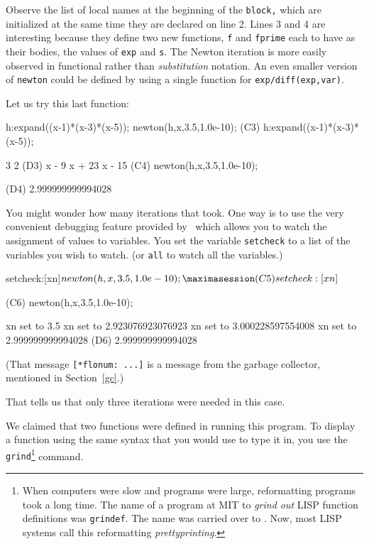 \endmaximasession

Observe the list of local names at the beginning of the 
{\tt block,}
which are initialized at the same time they are declared on line 2.
Lines 3 and 4 are interesting because they define two new functions,
{\tt f}
and 
{\tt fprime}
each to have as their bodies, the values of
{\tt exp}
and {\tt s}.
The Newton iteration is more easily observed in functional
rather than {\it substitution} notation.
An even smaller version of {\tt newton}
could be defined by
using a single function for {\tt exp/diff(exp,var)}.

Let us try this last function:

\beginmaximasession
h:expand((x-1)*(x-3)*(x-5));
newton(h,x,3.5,1.0e-10);
\maximasession
(C3) h:expand((x-1)*(x-3)*(x-5));

                              3      2
(D3)                         x  - 9 x  + 23 x - 15
(C4) newton(h,x,3.5,1.0e-10);

(D4)                           2.999999999994028
\endmaximasession

You might wonder how many iterations that took.  One way is to use
the very convenient debugging feature provided by
\Max\
which allows you to watch the assignment of values to variables.
You set the variable
{\tt setcheck}
to a list of the variables you wish to watch. (or 
{\tt all}
to watch all the variables.)

\beginmaximasession
setcheck:[xn]$
newton(h,x,3.5,1.0e-10);
\maximasession
(C5) setcheck:[xn]$

(C6) newton(h,x,3.5,1.0e-10);

xn set to 3.5
xn set to 2.923076923076923
xn set to 3.000228597554008
xn set to 2.999999999994028
(D6)                           2.999999999994028
\endmaximasession

(That message {\tt [*flonum: ...]} is a message from the
garbage collector, mentioned in Section~\ref{gc}.)

That tells us that only three iterations were needed in this case.

We claimed that two functions were defined in running this
program.  To display a function using the same syntax that
you would use to type it in, you use the {\tt grind}\footnote{When 
computers were slow and programs were large, reformatting programs
took a long time. The name of a program at MIT
to {\it grind out} LISP function definitions was {\tt grindef}.  
The name was carried over to \Max.  Now, most LISP systems call this 
reformatting {\it prettyprinting}.} command.

